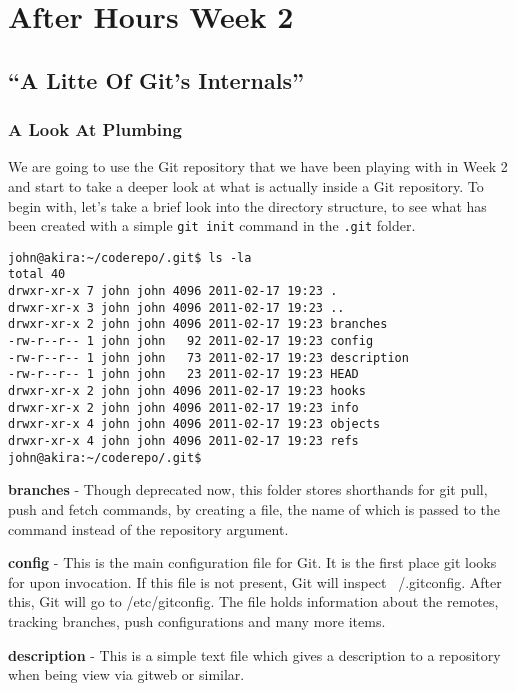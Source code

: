 \chapter{After Hours Week 2}
\section{``A Litte Of Git's Internals''}
\subsection{A Look At Plumbing}

We are going to use the Git repository that we have been playing with in Week 2 and start to take a deeper look at what is actually inside a Git repository.  To begin with, let's take a brief look into the directory structure, to see what has been created with a simple \texttt{git init}  command in the \texttt{.git} folder.

\begin{Verbatim}[frame=leftline,framerule=1mm,fontsize=\relsize{-3}] 
john@akira:~/coderepo/.git$ ls -la 
total 40 
drwxr-xr-x 7 john john 4096 2011-02-17 19:23 . 
drwxr-xr-x 3 john john 4096 2011-02-17 19:23 .. 
drwxr-xr-x 2 john john 4096 2011-02-17 19:23 branches 
-rw-r--r-- 1 john john   92 2011-02-17 19:23 config 
-rw-r--r-- 1 john john   73 2011-02-17 19:23 description 
-rw-r--r-- 1 john john   23 2011-02-17 19:23 HEAD 
drwxr-xr-x 2 john john 4096 2011-02-17 19:23 hooks 
drwxr-xr-x 2 john john 4096 2011-02-17 19:23 info 
drwxr-xr-x 4 john john 4096 2011-02-17 19:23 objects 
drwxr-xr-x 4 john john 4096 2011-02-17 19:23 refs 
john@akira:~/coderepo/.git$ 
\end{Verbatim} 

\textbf{branches} - Though deprecated now, this folder stores shorthands for git pull, push and fetch commands, by creating a file, the name of which is passed to the command instead of the repository argument.

\textbf{config} - This is the main configuration file for Git.  It is the first place git looks for upon invocation.  If this file is not present, Git will inspect ~/.gitconfig.  After this, Git will go to /etc/gitconfig.  The file holds information about the remotes, tracking branches, push configurations and many more items.

\textbf{description} - This is a simple text file which gives a description to a repository when being view via gitweb or similar.

